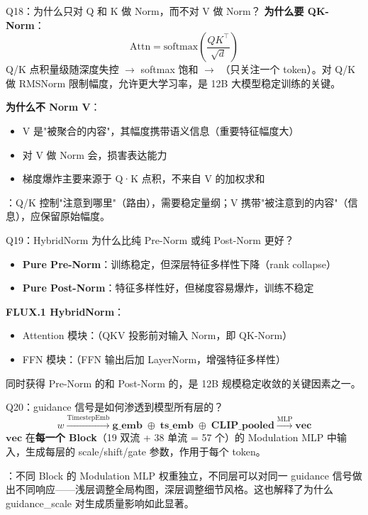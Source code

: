 \begin{conceptbox}{Q18：为什么只对 Q 和 K 做 Norm，而不对 V 做 Norm？}
\textbf{为什么要 QK-Norm}：
\[
\text{Attn} = \text{softmax}\!\left(\frac{QK^\top}{\sqrt{d}}\right)
\]
Q/K 点积量级随深度失控 $\to$ softmax 饱和 $\to$ （只关注一个 token）。对 Q/K 做 RMSNorm 限制幅度，允许更大学习率，是 12B 大模型稳定训练的关键。

\textbf{为什么不 Norm V}：
\begin{itemize}
  \item V 是"被聚合的内容"，其幅度携带语义信息（重要特征幅度大）
  \item 对 V 做 Norm 会，损害表达能力
  \item 梯度爆炸主要来源于 Q·K 点积，不来自 V 的加权求和
\end{itemize}

：Q/K 控制"注意到哪里"（路由），需要稳定量纲；V 携带"被注意到的内容"（信息），应保留原始幅度。
\end{conceptbox}

\begin{conceptbox}{Q19：HybridNorm 为什么比纯 Pre-Norm 或纯 Post-Norm 更好？}
\begin{itemize}
  \item \textbf{Pure Pre-Norm}：训练稳定，但深层特征多样性下降（rank collapse）
  \item \textbf{Pure Post-Norm}：特征多样性好，但梯度容易爆炸，训练不稳定
\end{itemize}

\textbf{FLUX.1 HybridNorm}：
\begin{itemize}
  \item Attention 模块：（QKV 投影前对输入 Norm，即 QK-Norm）
  \item FFN 模块：（FFN 输出后加 LayerNorm，增强特征多样性）
\end{itemize}

同时获得 Pre-Norm 的和 Post-Norm 的，是 12B 规模稳定收敛的关键因素之一。
\end{conceptbox}

\begin{conceptbox}{Q20：guidance 信号是如何渗透到模型所有层的？}
\[
w \xrightarrow{\text{TimestepEmb}} \mathbf{g\_emb} \;\oplus\; \mathbf{ts\_emb} \;\oplus\; \mathbf{CLIP\_pooled} \xrightarrow{\text{MLP}} \mathbf{vec}
\]
$\mathbf{vec}$ 在\textbf{每一个 Block}（19 双流 + 38 单流 = 57 个）的 Modulation MLP 中输入，生成每层的 scale/shift/gate 参数，作用于每个 token。

：不同 Block 的 Modulation MLP 权重独立，不同层可以对同一 guidance 信号做出不同响应——浅层调整全局构图，深层调整细节风格。这也解释了为什么 guidance\_scale 对生成质量影响如此显著。
\end{conceptbox}

